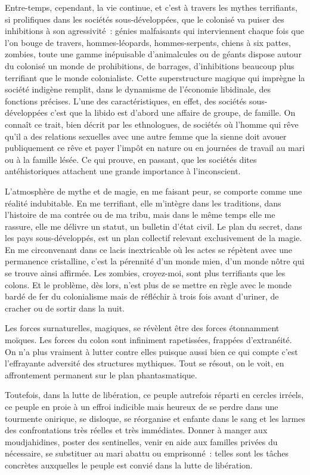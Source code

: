 \documentclass[french,twoside]{book} %
\begin{document}
Entre-temps, cependant, la vie continue, et c’est à travers les mythes terrifiants, si prolifiques dans les sociétés sous-développées, que le colonisé va puiser des inhibitions à son agressivité : génies malfaisants qui interviennent chaque fois que l’on bouge de travers, hommes-léopards, hommes-serpents, chiens à six pattes, zombies, toute une gamme inépuisable d’animalcules ou de géants dispose autour du colonisé un monde de prohibitions, de barrages, d’inhibitions beaucoup plus terrifiant que le monde colonialiste. Cette superstructure magique qui imprègne la société indigène remplit, dans le dynamisme de l’économie libidinale, des fonctions précises. L’une des caractéristiques, en effet, des sociétés sous-développées c’est que la libido est d’abord une affaire de groupe, de famille. On connaît ce trait, bien décrit par les ethnologues, de sociétés où l’homme qui rêve qu’il a des relations sexuelles avec une autre femme que la sienne doit avouer publiquement ce rêve et payer l’impôt en nature ou en journées de travail au mari ou à la famille lésée. Ce qui prouve, en passant, que les sociétés dites antéhistoriques attachent une grande importance à l’inconscient.\par
L’atmosphère de mythe et de magie, en me faisant peur, se comporte comme une réalité indubitable. En me terrifiant, elle m’intègre dans les traditions, dans l’histoire de ma contrée ou de ma tribu, mais dans le même temps elle me rassure, elle me délivre un statut, un bulletin d’état civil. Le plan du secret, dans les pays sous-développés, est un plan collectif relevant exclusivement de la magie. En me circonvenant dans ce lacis inextricable où les actes se répètent avec une permanence cristalline, c’est la pérennité d’un monde mien, d’un monde nôtre qui se   trouve ainsi affirmée. Les zombies, croyez-moi, sont plus terrifiants que les colons. Et le problème, dès lors, n’est plus de se mettre en règle avec le monde bardé de fer du colonialisme mais de réfléchir à trois fois avant d’uriner, de cracher ou de sortir dans la nuit.\par
Les forces surnaturelles, magiques, se révèlent être des forces étonnamment moïques. Les forces du colon sont infiniment rapetissées, frappées d’extranéité. On n’a plus vraiment à lutter contre elles puisque aussi bien ce qui compte c’est l’effrayante adversité des structures mythiques. Tout se résout, on le voit, en affrontement permanent sur le plan phantasmatique.\par
\bigbreak
\noindent Toutefois, dans la lutte de libération, ce peuple autrefois réparti en cercles irréels, ce peuple en proie à un effroi indicible mais heureux de se perdre dans une tourmente onirique, se disloque, se réorganise et enfante dans le sang et les larmes des confrontations très réelles et très immédiates. Donner à manger aux moudjahidines, poster des sentinelles, venir en aide aux familles privées du nécessaire, se substituer au mari abattu ou emprisonné : telles sont les tâches concrètes auxquelles le peuple est convié dans la lutte de libération.\par
\end{document}
